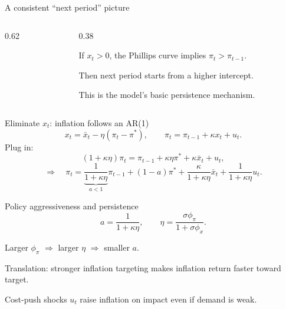 \documentclass[aspectratio=169,xcolor=dvipsnames]{beamer}
\let\tempone\itemize
\let\temptwo\enditemize
\renewenvironment{itemize}{\tempone\addtolength{\itemsep}{\fill}}{\temptwo}
\newcommand{\xpiaxes}[0]{%
  \draw[axis] (-2.6,0) -- (2.8,0) node[below right] {$x_t$ (output gap)};
  \draw[axis] (0,-0.2) -- (0,4.0) node[above left] {$\pi_t$ (inflation)};
  \foreach \xx in {-2,-1,1,2} \draw (\xx,0) -- (\xx,-0.07);
  \foreach \yy in {1,2,3} \draw (0,\yy) -- (-0.07,\yy);
}
\begin{document}
\begin{frame}{A consistent ``next period'' picture}
\begin{columns}
\begin{column}{0.62\textwidth}
\centering
{}
\end{column}

\begin{column}{0.38\textwidth}
\small
\begin{itemize}
\item If $x_t>0$, the Phillips curve implies $\pi_t>\pi_{t-1}$.
\item Then next period starts from a higher intercept.
\item This is the model’s basic persistence mechanism.
\end{itemize}
\end{column}
\end{columns}
\end{frame}

\begin{frame}{Eliminate $x_t$: inflation follows an AR(1)}
\small
\[
x_t = \bar x_t - \eta(\pi_t-\pi^\ast),\qquad
\pi_t = \pi_{t-1} + \kappa x_t + u_t.
\]
Plug in:
\[
(1+\kappa\eta)\pi_t = \pi_{t-1} + \kappa\eta\pi^\ast + \kappa\bar x_t + u_t,
\]
\[
\Rightarrow\quad
\pi_t = \underbrace{\frac{1}{1+\kappa\eta}}_{a<1}\pi_{t-1} + (1-a)\pi^\ast
      + \frac{\kappa}{1+\kappa\eta}\bar x_t + \frac{1}{1+\kappa\eta}u_t.
\]
\end{frame}

\begin{frame}{Policy aggressiveness and persistence}
\small
\[
a=\frac{1}{1+\kappa\eta},\qquad
\eta=\frac{\sigma\phi_\pi}{1+\sigma\phi_x}.
\]
\begin{itemize}
\item Larger $\phi_\pi$ $\Rightarrow$ larger $\eta$ $\Rightarrow$ smaller $a$.
\item Translation: stronger inflation targeting makes inflation return faster toward target.
\item Cost-push shocks $u_t$ raise inflation on impact even if demand is weak.
\end{itemize}
\end{frame}
\end{document}
